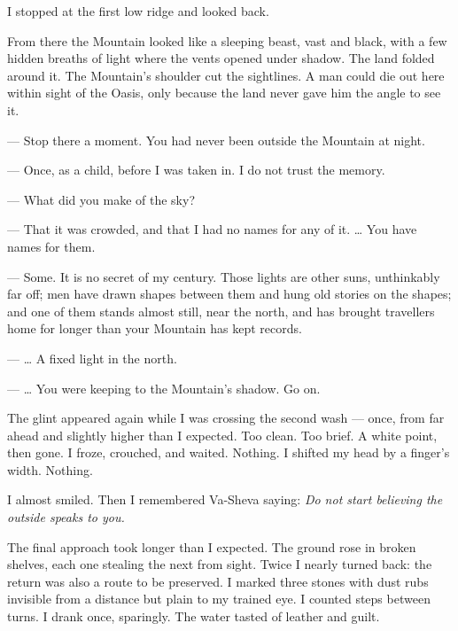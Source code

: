 I stopped at the first low ridge and looked back.\par

From there the Mountain looked like a sleeping beast, vast and black, with a few hidden breaths of light where the vents opened under shadow. The land folded around it. The Mountain's shoulder cut the sightlines. A man could die out here within sight of the Oasis, only because the land never gave him the angle to see it.\par

\ornament

\begin{room}

--- Stop there a moment. You had never been outside the Mountain at night.

--- Once, as a child, before I was taken in. I do not trust the memory.

--- What did you make of the sky?

--- That it was crowded, and that I had no names for any of it. \ldots{} You have names for them.

--- Some. It is no secret of my century. Those lights are other suns, unthinkably far off; men have drawn shapes between them and hung old stories on the shapes; and one of them stands almost still, near the north, and has brought travellers home for longer than your Mountain has kept records.

--- \ldots{} A fixed light in the north.

--- \ldots{} You were keeping to the Mountain's shadow. Go on.

\end{room}

\ornament


The glint appeared again while I was crossing the second wash --- once, from far ahead and slightly higher than I expected. Too clean. Too brief. A white point, then gone. I froze, crouched, and waited. Nothing. I shifted my head by a finger's width. Nothing.\par

I almost smiled. Then I remembered Va-Sheva saying: \textit{Do not start believing the outside speaks to you.}\par

The final approach took longer than I expected. The ground rose in broken shelves, each one stealing the next from sight. Twice I nearly turned back: the return was also a route to be preserved. I marked three stones with dust rubs invisible from a distance but plain to my trained eye. I counted steps between turns. I drank once, sparingly. The water tasted of leather and guilt.\par


